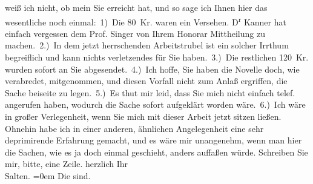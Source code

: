 \begin{ledgroupsized}[t]{13cm}
               weiß ich nicht, ob mein \label{K_L03334-1v}\label{K_L03334-1h} Sie erreicht hat, und so sage ich Ihnen hier das wesentliche noch
               einmal: 1) Die 80 Kr. waren ein Versehen. D\textsuperscript{r}{ }Kanner hat einfach vergessen dem Prof. Singer von Ihrem Honorar Mittheilung zu
               machen. 2.) In dem jetzt herrschenden Arbeitstrubel ist ein solcher Irrthum
               begreiflich und kann nichts verletzendes für Sie haben. 3.) Die restlichen 120 Kr.
               wurden sofort an Sie abgesendet. 4.) Ich hoffe, Sie haben die Novelle doch, wie verabredet, mitgenommen,
               und diesen Vorfall nicht zum Anlaß ergriffen, die Sache beiseite zu legen. 5.) Es
               thut mir leid, dass Sie mich nicht einfach telef. angerufen haben, wodurch die Sache
               sofort aufgeklärt worden wäre. 6.) Ich wäre in großer Verlegenheit, wenn Sie mich mit
               dieser Arbeit jetzt sitzen ließen.\pend
           \pstart
           Ohnehin habe ich in einer anderen, ähnlichen Angelegenheit eine sehr deprimirende
               Erfahrung gemacht, und es wäre mir unangenehm, wenn man hier die Sachen, wie es ja
               doch einmal geschieht, anders auffaßen würde. Schreiben Sie mir, bitte, eine
               Zeile.\pend
           \pstart
           herzlich Ihr {\\[\baselineskip]}\spacefill\mbox{Salten.}\pend
           \leftskip=0em{}\pstart
           \noindent{}\label{K_L03334-2v}\label{K_L03334-2h} Die \label{K_L03334-3v}\label{K_L03334-3h} sind.\pend
           
         
         \endnumbering{}\end{ledgroupsized}  \newcommand{\dateiname}{L03334}\newcommand{\titel}{Felix Salten an Arthur Schnitzler, 4. 9. 1902}\newcommand{\editorInnen}{Martin Anton Müller und Laura Untner}
      
